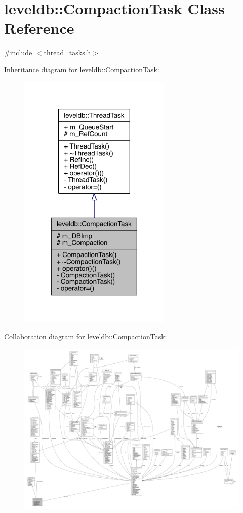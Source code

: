 \hypertarget{classleveldb_1_1_compaction_task}{}\section{leveldb\+:\+:Compaction\+Task Class Reference}
\label{classleveldb_1_1_compaction_task}


{\ttfamily \#include $<$thread\+\_\+tasks.\+h$>$}



Inheritance diagram for leveldb\+:\+:Compaction\+Task\+:\nopagebreak
\begin{figure}[H]
\begin{center}
\leavevmode
\includegraphics[width=207pt]{classleveldb_1_1_compaction_task__inherit__graph}
\end{center}
\end{figure}


Collaboration diagram for leveldb\+:\+:Compaction\+Task\+:
\nopagebreak
\begin{figure}[H]
\begin{center}
\leavevmode
\includegraphics[width=350pt]{classleveldb_1_1_compaction_task__coll__graph}
\end{center}
\end{figure}
